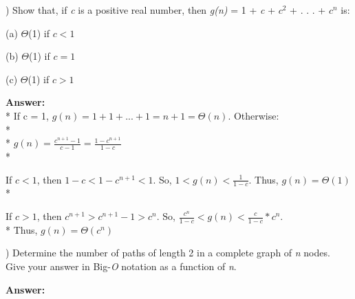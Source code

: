 \documentclass{article}
\begin{document}
\vspace{.5in}
) Show that, if \textit{c} is a positive real number, then \textit{g(n)} = 1 + \textit{c} + $c^2$ + . . . + 
\indent$c^n$ is:

\vspace{.1in}
\indent (a) $\Theta$(1) if $c < 1$

\indent (b) $\Theta$(1) if $c = 1$

\indent (c) $\Theta$(1) if $c > 1$

\vspace{.1in}
{\bf Answer:}
\\* \indent If c = 1, $g(n) = 1 + 1 + . . .  + 1 = n + 1 = \Theta(n)$. Otherwise:
\\* \\* \indent \indent \indent $g(n) = \frac{c^{n + 1} - 1}{c - 1} = \frac{1 - c^{n + 1}}{1 - c}$ \\* 

\indent If $c < 1$, then $1 - c < 1 - c^{n + 1} < 1$. So, $1 < g(n) < \frac{1}{1 - c}$. Thus, $g(n) = \Theta(1)$ \\*

\indent If $c > 1$, then $c^{n + 1} > c^{n + 1} - 1 > c^n$. So, $\frac{c^n}{1 - c} < g(n) < \frac{c}{1 - c} * c^n$. \\*
\indent Thus, $g(n) = \Theta(c^n)$

\vspace{.5in}
) Determine the number of paths of length 2 in a complete graph of \textit{n} nodes.
\indent Give your answer in Big-\textit{O} notation as a function of \textit{n}.

\vspace{.1in}
{\bf Answer:}
\end{document}
